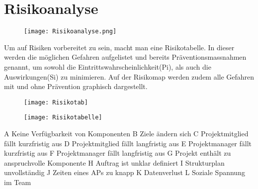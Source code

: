 \section{Risikoanalyse}
\begin{figure}[H]
	\centering
	\texttt{[image: Risikoanalyse.png]}
	\label{fig:Risikoanalyse}
\end{figure}

\newpage

Um auf Risiken vorbereitet zu sein, macht man eine Risikotabelle. In dieser werden die möglichen Gefahren aufgelistet und bereits Präventionsmassnahmen genannt, um sowohl die Eintrittswahrscheinlichkeit(Pi), als auch die Auswirkungen(Si) zu minimieren. Auf der Risikomap werden zudem alle Gefahren mit und ohne Prävention graphisch dargestellt.

\begin{figure}[H]
	\centering
	\texttt{[image: Risikotab]}
	\label{fig:Risikodiagramm}
\end{figure}

\begin{figure}[H]
	\centering
	\texttt{[image: Risikotabelle]}
	\label{fig:Tabelle}
\end{figure}
A Keine Verfügbarkeit von Komponenten
B Ziele ändern sich
C Projektmitglied fällt kurzfristig aus
D Projektmitglied fällt langfristig aus
E Projektmanager fällt kurzfristig aus
F Projektmanager fällt langfristig aus
G Projekt enthält zu anspruchvolle Komponente
H Auftrag ist unklar definiert
I Strukturplan unvollständig
J Zeiten eines APs zu knapp
K Datenverlust
L Soziale Spannung im Team

